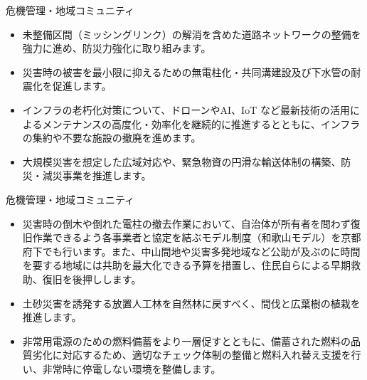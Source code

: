 \documentclass[dvipdfmx]{beamer}
\begin{document}
    \begin{frame}{危機管理・地域コミュニティ}{}
        \begin{small}
            \begin{itemize}
                \setlength{\itemsep}{2mm}
                \item 未整備区間（ミッシングリンク）の解消を含めた道路ネットワークの整備を強力に進め、防災力強化に取り組みます。
                \item 災害時の被害を最小限に抑えるための無電柱化・共同溝建設及び下水管の耐震化を促進します。
                \item インフラの老朽化対策について、ドローンやAI、IoT など最新技術の活用によるメンテナンスの高度化・効率化を継続的に推進するとともに、インフラの集約や不要な施設の撤廃を進めます。
                \item 大規模災害を想定した広域対応や、緊急物資の円滑な輸送体制の構築、防災・減災事業を推進します。
            \end{itemize}
        \end{small}
    \end{frame}
    
    \begin{frame}{危機管理・地域コミュニティ}{}
        \begin{small}
            \begin{itemize}
                \setlength{\itemsep}{2mm}
                \item 災害時の倒木や倒れた電柱の撤去作業において、自治体が所有者を問わず復旧作業できるよう各事業者と協定を結ぶモデル制度（和歌山モデル）を京都府下でも行います。また、中山間地や災害多発地域など公助が及ぶのに時間を要する地域には共助を最大化できる予算を措置し、住民自らによる早期救助、復旧を後押しします。
                \item 土砂災害を誘発する放置人工林を自然林に戻すべく、間伐と広葉樹の植栽を推進します。
                \item 非常用電源のための燃料備蓄をより一層促すとともに、備蓄された燃料の品質劣化に対応するため、適切なチェック体制の整備と燃料入れ替え支援を行い、非常時に停電しない環境を整備します。
            \end{itemize}
        \end{small}
    \end{frame}
    
\end{document}
